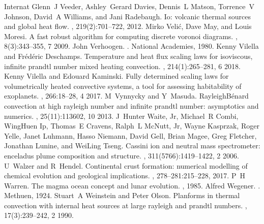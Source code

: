 \documentclass[letterpaper,10pt,english]{jupyterBook}
\begin{document}
\begin{sphinxthebibliography}{Internat}
\sphinxAtStartPar
Glenn J Veeder, Ashley Gerard Davies, Dennis L Matson, Torrence V Johnson, David A Williams, and Jani Radebaugh. Io: volcanic thermal sources and global heat flow. , 219(2):701–722, 2012.
\sphinxAtStartPar
Mirko Velić, Dave May, and Louis Moresi. A fast robust algorithm for computing discrete voronoi diagrams. , 8(3):343–355, 7 2009.
\sphinxAtStartPar
John Verhoogen. . National Academies, 1980.
\sphinxAtStartPar
Kenny Vilella and Frédéric Deschamps. Temperature and heat flux scaling laws for isoviscous, infinite prandtl number mixed heating convection. , 214(1):265–281, 6 2018.
\sphinxAtStartPar
Kenny Vilella and Edouard Kaminski. Fully determined scaling laws for volumetrically heated convective systems, a tool for assessing habitability of exoplanets. , 266:18–28, 4 2017.
\sphinxAtStartPar
M Vynnycky and Y Masuda. Rayleigh\sphinxhyphen{}Bénard convection at high rayleigh number and infinite prandtl number: asymptotics and numerics. , 25(11):113602, 10 2013.
\sphinxAtStartPar
J Hunter Waite, Jr, Michael R Combi, Wing\sphinxhyphen{}Huen Ip, Thomas E Cravens, Ralph L McNutt, Jr, Wayne Kasprzak, Roger Yelle, Janet Luhmann, Hasso Niemann, David Gell, Brian Magee, Greg Fletcher, Jonathan Lunine, and Wei\sphinxhyphen{}Ling Tseng. Cassini ion and neutral mass spectrometer: enceladus plume composition and structure. , 311(5766):1419–1422, 2 2006.
\sphinxAtStartPar
U Walzer and R Hendel. Continental crust formation: numerical modelling of chemical evolution and geological implications. , 278–281:215–228, 2017.
\sphinxAtStartPar
P H Warren. The magma ocean concept and lunar evolution. , 1985.
\sphinxAtStartPar
Alfred Wegener. . Methuen, 1924.
\sphinxAtStartPar
Stuart A Weinstein and Peter Olson. Planforms in thermal convection with internal heat sources at large rayleigh and prandtl numbers. , 17(3):239–242, 2 1990.

\end{sphinxthebibliography}
\end{document}
